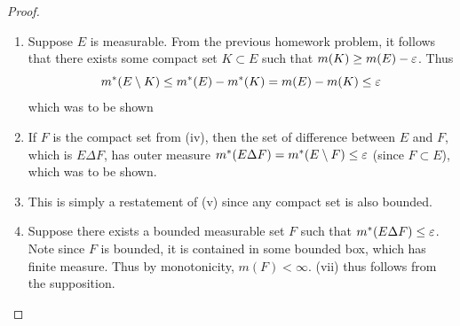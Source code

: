 \documentclass[hw_all.tex]{subfiles}
\begin{document}
\begin{proof}
\begin{enumerate}
        \item[i $\Rightarrow$ iv)]
            Suppose $E$ is measurable. From the previous homework problem, it follows that there exists some compact set $K \subset E$ such that $m(K) \geq m(E) - \varepsilon$. Thus 
            \[
                m^*(E \setminus K) \leq m^*(E) - m^*(K) = m(E) - m(K) \leq \varepsilon
            \]
            which was to be shown

        \item[iv $\Rightarrow$ v)]
            If $F$ is the compact set from (iv), then the set of difference between $E$ and $F$, which is $E \Delta F$, has outer measure $m^*(E \Delta F) = m^*(E \setminus F) \leq \varepsilon$ (since $F \subset E$), which was to be shown.
            
        \item[v $\Rightarrow$ vi)]
            This is simply a restatement of (v) since any compact set is also bounded.

        \item[vi $\Rightarrow$ vii)]
            Suppose there exists a bounded measurable set $F$ such that $m^*(E \Delta F) \leq \varepsilon$. Note since $F$ is bounded, it is contained in some bounded box, which has finite measure. Thus by monotonicity, $m(F) < \infty$. (vii) thus follows from the supposition.
            

\end{enumerate}
\end{proof}
\end{document}
